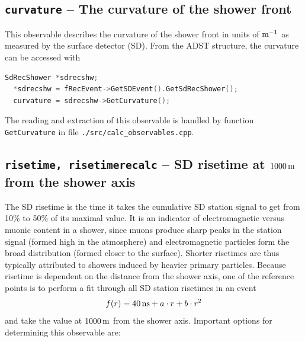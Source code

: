 \documentclass[12pt,a4paper]{report}
\begin{document}
\subsection{\texttt{curvature} -- The curvature of the shower front}
This observable describes the curvature of the shower front in units of $\unit[]{m^{-1}}$ as measured by the surface detector (SD). From the ADST structure, the curvature can be accessed with
\begin{lstlisting}[language=C++]
  SdRecShower *sdrecshw;
  *sdrecshw = fRecEvent->GetSDEvent().GetSdRecShower();
  curvature = sdrecshw->GetCurvature();
\end{lstlisting}
The reading and extraction of this observable is handled by function \texttt{GetCurvature} in file \texttt{./src/calc\_observables.cpp}.

\subsection{\texttt{risetime, risetimerecalc} -- SD risetime at $\unit[1000]{m}$ from the shower axis}
The SD risetime is the time it takes the cumulative SD station signal to get from 10\% to 50\% of its maximal value. It is an indicator of electromagnetic versus muonic content in a shower, since muons produce sharp peaks in the station signal (formed high in the atmosphere) and electromagnetic particles form the broad distribution (formed closer to the surface). Shorter risetimes are thus typically attributed to showers induced by heavier primary particles. Because risetime is dependent on the distance from the shower axis, one of the reference points is to perform a fit through all SD station risetimes in an event
\begin{equation}\label{eq:risetimeFit}
f(r) = \unit[40]{ns} + a\cdot r + b\cdot r^2
\end{equation}
and take the value at $\unit[1000]{m}$ from the shower axis. Important options for determining this observable are:
\end{document}

